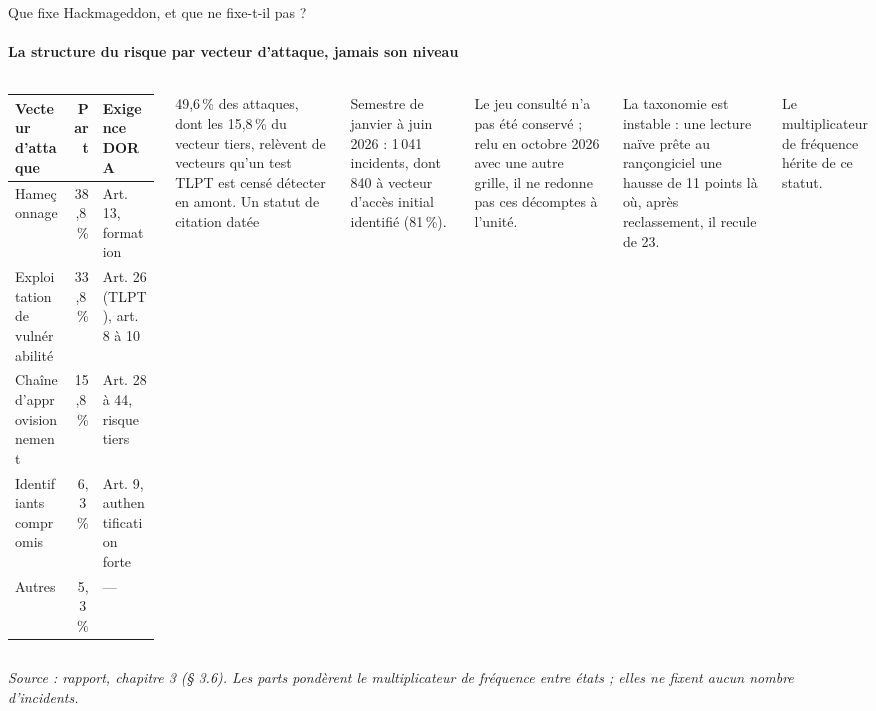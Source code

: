 \documentclass[aspectratio=169,10pt,t]{beamer}
\newcommand{\source}[1]{\par\vfill{\tiny\color{gris}\textit{Source : #1}}\par\vspace{-1mm}}
\renewcommand{\arraystretch}{1.25}
\begin{document}
\begin{frame}{Que fixe Hackmageddon, et que ne fixe-t-il pas ?}
  \framesubtitle{\etabli La structure du risque par vecteur d'attaque, jamais son niveau}
  \begin{columns}[T,onlytextwidth]
    \footnotesize
    \renewcommand{\arraystretch}{1.1}
    \begin{tabularx}{\linewidth}{@{}Y r Y@{}}
      \toprule
      \textbf{Vecteur d'attaque} & \textbf{Part} & \textbf{Exigence DORA} \\
      \midrule
      Hameçonnage & 38,8\,\% & Art. 13, formation \\
      Exploitation de vulnérabilité & 33,8\,\% & Art. 26 (TLPT), art. 8 à 10 \\
      Chaîne d'approvisionnement & 15,8\,\% & Art. 28 à 44, risque tiers \\
      Identifiants compromis & 6,3\,\% & Art. 9, authentification forte \\
      Autres & 5,3\,\% & --- \\
      \bottomrule
    \end{tabularx}\par\vspace{2mm}
    49,6\,\% des attaques, dont les 15,8\,\% du vecteur tiers, relèvent de vecteurs qu'un test TLPT est censé détecter en amont.
    \footnotesize
    {\editorial\normalsize Un statut de citation datée}\par\vspace{1.5mm}
    Semestre de janvier à juin 2026 : 1\,041 incidents, dont 840 à vecteur d'accès initial identifié (81\,\%).\par\vspace{1.5mm}
    Le jeu consulté n'a pas été conservé ; relu en octobre 2026 avec une autre grille, il ne redonne pas ces décomptes à l'unité.\par\vspace{1.5mm}
    La taxonomie est instable : une lecture naïve prête au rançongiciel une hausse de 11 points là où, après reclassement, il recule de 23.\par\vspace{1.5mm}
    {\color{accent}Le multiplicateur de fréquence hérite de ce statut.}
  \end{columns}
  \source{rapport, chapitre 3 (§ 3.6). Les parts pondèrent le multiplicateur de fréquence entre états ; elles ne fixent aucun nombre d'incidents.}
\end{frame}
\end{document}
